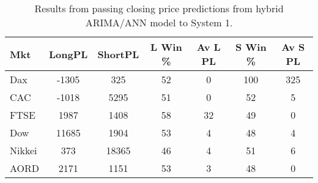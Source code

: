 \begin{table}[ht]
\centering
\caption[Results from passing closing price predictions from hybrid ARIMA/ANN model to System 1]{Results from passing closing price predictions from hybrid ARIMA/ANN model to System 1.} 
\label{tab:chp_ts:arima_ann_sys1}
\begin{tabular}{lcccccc}
  \toprule Mkt & LongPL & ShortPL & L Win \% & Av L PL & S Win \% & Av S PL \\ 
  \midrule Dax & -1305 & 325 & 52 & 0 & 100 & 325 \\ 
  CAC & -1018 & 5295 & 51 & 0 & 52 & 5 \\ 
  FTSE & 1987 & 1408 & 58 & 32 & 49 & 0 \\ 
  Dow & 11685 & 1904 & 53 & 4 & 48 & 4 \\ 
  Nikkei & 373 & 18365 & 46 & 4 & 51 & 6 \\ 
  AORD & 2171 & 1151 & 53 & 3 & 48 & 0 \\ 
   \bottomrule \end{tabular}
\end{table}
